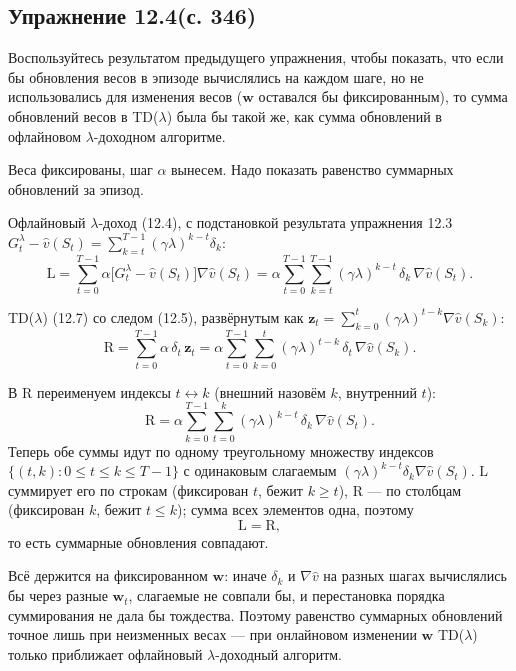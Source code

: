 \subsection{Упражнение 12.4(с. 346)}
Воспользуйтесь результатом предыдущего упражнения, чтобы показать, что если бы
обновления весов в эпизоде вычислялись на каждом шаге, но не использовались для
изменения весов ($\mathbf w$ оставался бы фиксированным), то сумма обновлений
весов в TD($\lambda$) была бы такой же, как сумма обновлений в офлайновом
$\lambda$-доходном алгоритме.

\begin{solution}
    Веса фиксированы, шаг $\alpha$ вынесем. Надо показать равенство суммарных
    обновлений за эпизод.

    Офлайновый $\lambda$-доход (12.4), с подстановкой результата упражнения 12.3
    $G_t^\lambda-\hat v(S_t)=\sum_{k=t}^{T-1}(\gamma\lambda)^{k-t}\delta_k$:
    \begin{equation*}
        \mathrm{L} = \sum_{t=0}^{T-1}\alpha\big[G_t^\lambda-\hat v(S_t)\big]\nabla\hat v(S_t)
        = \alpha\sum_{t=0}^{T-1}\sum_{k=t}^{T-1}(\gamma\lambda)^{k-t}\,\delta_k\,\nabla\hat v(S_t).
    \end{equation*}

    TD($\lambda$) (12.7) со следом (12.5), развёрнутым как $\mathbf z_t=\sum_{k=0}^{t}(\gamma\lambda)^{t-k}\nabla\hat v(S_k)$:
    \begin{equation*}
        \mathrm{R} = \sum_{t=0}^{T-1}\alpha\,\delta_t\,\mathbf z_t
        = \alpha\sum_{t=0}^{T-1}\sum_{k=0}^{t}(\gamma\lambda)^{t-k}\,\delta_t\,\nabla\hat v(S_k).
    \end{equation*}

    В $\mathrm{R}$ переименуем индексы $t\leftrightarrow k$ (внешний назовём $k$, внутренний $t$):
    \begin{equation*}
        \mathrm{R} = \alpha\sum_{k=0}^{T-1}\sum_{t=0}^{k}(\gamma\lambda)^{k-t}\,\delta_k\,\nabla\hat v(S_t).
    \end{equation*}
    Теперь обе суммы идут по одному треугольному множеству индексов
    $\{(t,k):0\le t\le k\le T-1\}$ с одинаковым слагаемым $(\gamma\lambda)^{k-t}\delta_k\nabla\hat v(S_t)$.
    $\mathrm{L}$ суммирует его по строкам (фиксирован $t$, бежит $k\ge t$), $\mathrm{R}$ ---
    по столбцам (фиксирован $k$, бежит $t\le k$); сумма всех элементов одна, поэтому
    \begin{equation*}
        \mathrm{L} = \mathrm{R},
    \end{equation*}
    то есть суммарные обновления совпадают.

    Всё держится на фиксированном $\mathbf w$: иначе $\delta_k$ и $\nabla\hat v$ на
    разных шагах вычислялись бы через разные $\mathbf w_t$, слагаемые не совпали бы,
    и перестановка порядка суммирования не дала бы тождества. Поэтому равенство
    суммарных обновлений точное лишь при неизменных весах --- при онлайновом
    изменении $\mathbf w$ TD($\lambda$) только приближает офлайновый
    $\lambda$-доходный алгоритм.
\end{solution}

